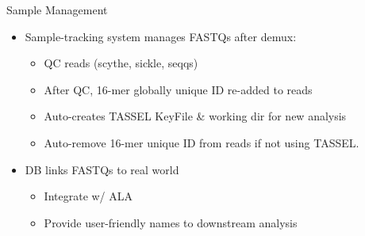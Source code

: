 \documentclass{beamer}
\begin{document}
\begin{frame}{Sample Management}
  \begin{itemize}
    \item Sample-tracking system manages FASTQs after demux:
    \begin{itemize}
      \item QC reads (scythe, sickle, seqqs)
      \item After QC, 16-mer globally unique ID re-added to reads
      \item Auto-creates TASSEL KeyFile \& working dir for new analysis
      \item Auto-remove 16-mer unique ID from reads if not using TASSEL.
    \end{itemize}
  \end{itemize}
  \pause
  \begin{itemize}
    \item DB links FASTQs to real world
      \begin{itemize}
        \item Integrate w/ ALA
        \item Provide user-friendly names to downstream analysis
      \end{itemize}
  \end{itemize}
  \vfill
\end{frame}
\end{document}
